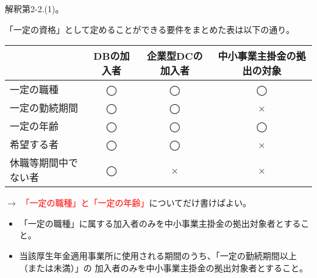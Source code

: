 \begin{itembox}[l]{}
  解釈第2-2.(1)。

  「一定の資格」として定めることができる要件をまとめた表は以下の通り。

  \;

  \begin{center}
    \begin{tabular}{l|ccc} 
      \hline
      & DBの加入者 & 企業型DCの加入者 & 中小事業主掛金の拠出の対象 \\
      \hline \hline
      一定の職種 & ◯ & ◯ & ◯ \\
      一定の勤続期間 & ◯ & ◯ & ×\\
      一定の年齢 & ◯ & ◯ & ◯ \\
      希望する者 & ◯ & ◯ & ×\\
      休職等期間中でない者 & ◯ & × & ×\\
    \end{tabular}
  \end{center}

  $\rightarrow$ \textcolor{red}{「一定の職種」と「一定の年齢」}についてだけ書けばよい。
\end{itembox}

\begin{sol}
  \;

  \begin{itemize}
    \item 「一定の職種」に属する加入者のみを中小事業主掛金の拠出対象者とすること。
    \item 当該厚生年金適用事業所に使用される期間のうち、「一定の勤続期間以上（または未満）」の
    加入者のみを中小事業主掛金の拠出対象者とすること。
  \end{itemize}

\end{sol}


\newpage